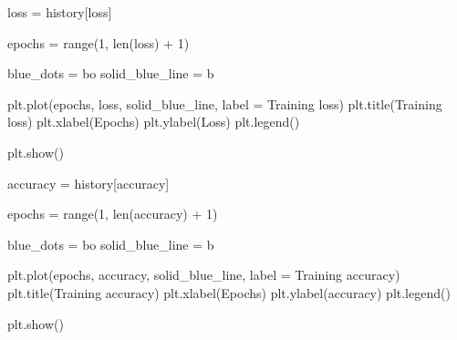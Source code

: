 \documentclass[
  letterpaper,
  DIV=11,
  numbers=noendperiod]{scrreprt}
\newenvironment{Shaded}{\begin{snugshade}}{\end{snugshade}}
\newcommand{\BuiltInTok}[1]{\textcolor[rgb]{0.00,0.23,0.31}{#1}}
\newcommand{\DecValTok}[1]{\textcolor[rgb]{0.68,0.00,0.00}{#1}}
\newcommand{\NormalTok}[1]{\textcolor[rgb]{0.00,0.23,0.31}{#1}}
\newcommand{\OperatorTok}[1]{\textcolor[rgb]{0.37,0.37,0.37}{#1}}
\newcommand{\StringTok}[1]{\textcolor[rgb]{0.13,0.47,0.30}{#1}}
\begin{document}
\begin{Shaded}
\begin{Highlighting}[]
\NormalTok{loss }\OperatorTok{=}\NormalTok{ history[}\StringTok{\textquotesingle{}loss\textquotesingle{}}\NormalTok{]}

\NormalTok{epochs }\OperatorTok{=} \BuiltInTok{range}\NormalTok{(}\DecValTok{1}\NormalTok{, }\BuiltInTok{len}\NormalTok{(loss) }\OperatorTok{+} \DecValTok{1}\NormalTok{)}

\NormalTok{blue\_dots }\OperatorTok{=} \StringTok{\textquotesingle{}bo\textquotesingle{}}
\NormalTok{solid\_blue\_line }\OperatorTok{=} \StringTok{\textquotesingle{}b\textquotesingle{}}

\NormalTok{plt.plot(epochs, loss, solid\_blue\_line, label }\OperatorTok{=} \StringTok{\textquotesingle{}Training loss\textquotesingle{}}\NormalTok{)}
\NormalTok{plt.title(}\StringTok{\textquotesingle{}Training loss\textquotesingle{}}\NormalTok{)}
\NormalTok{plt.xlabel(}\StringTok{\textquotesingle{}Epochs\textquotesingle{}}\NormalTok{)}
\NormalTok{plt.ylabel(}\StringTok{\textquotesingle{}Loss\textquotesingle{}}\NormalTok{)}
\NormalTok{plt.legend()}

\NormalTok{plt.show()}
\end{Highlighting}
\end{Shaded}

\begin{Shaded}
\begin{Highlighting}[]
\NormalTok{accuracy }\OperatorTok{=}\NormalTok{ history[}\StringTok{\textquotesingle{}accuracy\textquotesingle{}}\NormalTok{]}

\NormalTok{epochs }\OperatorTok{=} \BuiltInTok{range}\NormalTok{(}\DecValTok{1}\NormalTok{, }\BuiltInTok{len}\NormalTok{(accuracy) }\OperatorTok{+} \DecValTok{1}\NormalTok{)}

\NormalTok{blue\_dots }\OperatorTok{=} \StringTok{\textquotesingle{}bo\textquotesingle{}}
\NormalTok{solid\_blue\_line }\OperatorTok{=} \StringTok{\textquotesingle{}b\textquotesingle{}}

\NormalTok{plt.plot(epochs, accuracy, solid\_blue\_line, label }\OperatorTok{=} \StringTok{\textquotesingle{}Training accuracy\textquotesingle{}}\NormalTok{)}
\NormalTok{plt.title(}\StringTok{\textquotesingle{}Training accuracy\textquotesingle{}}\NormalTok{)}
\NormalTok{plt.xlabel(}\StringTok{\textquotesingle{}Epochs\textquotesingle{}}\NormalTok{)}
\NormalTok{plt.ylabel(}\StringTok{\textquotesingle{}accuracy\textquotesingle{}}\NormalTok{)}
\NormalTok{plt.legend()}

\NormalTok{plt.show()}
\end{Highlighting}
\end{Shaded}
\end{document}
